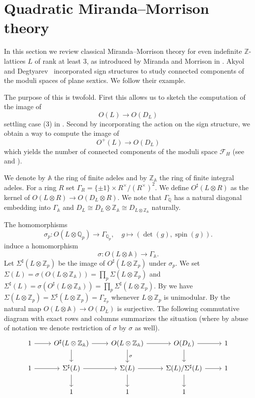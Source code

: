 \documentclass[a4paper]{amsart}
\theoremstyle{definition}
\theoremstyle{plain}
\newcommand{\QQ}{\mathbb{Q}}
\newcommand{\ZZ}{\mathbb{Z}}
\renewcommand{\AA}{\mathbb{A}}
\newcommand{\F}{\mathcal{F}}
\newcommand{\disc}[1]{{D_{#1}}}
\DeclareMathOperator{\spin}{spin}
\begin{document}
\section{Quadratic Miranda--Morrison theory} \label{mmtheory}
%
%
%
%
%
%
%
%
%
%
%
%
%

%

In this section we review classical Miranda--Morrison theory for even indefinite $\ZZ$-lattices $L$ of rank at least $3$,
as introduced by Miranda and Morrison in \cite{miranda-morrisonI, miranda-morrisonII}. Akyol and Degtyarev~\cite{sextics} incorporated sign structures to study connected components of the moduli spaces of plane sextics. We follow their example.

The purpose of this is twofold.
First this allows us to sketch the computation of the image of 
\[O(L) \to O(\disc{L})\]
settling case (3) in .
Second by incorporating the action on the sign structure, we obtain a way to
compute the image of
\[O^+(L) \to O(\disc{L})\]
which yields the number of connected components of the moduli space $\F_H$ (see  and ).


%
%
%
%
%

We denote by $\AA$ %
the ring of finite adeles and by $\ZZ_\AA$ %
the ring of finite integral adeles.
For a ring $R$ set $\Gamma_R= \{\pm 1\} \times R^\times/(R^\times)^2$.
We define $O^\sharp(L\otimes R)$ as the kernel of $O(L \otimes R) \to O(D_L \otimes R)$.
We note that $\Gamma_\QQ$ has a natural diagonal embedding into $\Gamma_\AA$ and $D_L \cong D_L \otimes \ZZ_\AA\cong \disc{L \otimes \ZZ_\AA}$ naturally.

The homomorphisms
\[\sigma_p \colon O(L\otimes \QQ_p) \to \Gamma_{\QQ_p}, \quad g \mapsto (\det(g),\spin(g)).\]
induce a homomorphism
\[ \sigma\colon O(L \otimes \AA) \to \Gamma_{\AA}.\]
Let $\Sigma^\sharp(L \otimes {\ZZ_p})$ be the image of $O^\sharp(L \otimes {\ZZ_p})$
under $\sigma_p$.
We set $\Sigma(L) =\sigma(O(L\otimes \ZZ_\AA))=\prod_p \Sigma(L \otimes \ZZ_p)$
and $\Sigma^\sharp(L) = \sigma(O^\sharp(L \otimes \ZZ_\AA))=\prod_p \Sigma^\sharp(L\otimes \ZZ_p)$.
By \cite[VII 12.11]{miranda-morrison} we have $\Sigma(L\otimes \ZZ_p)=\Sigma^\sharp(L \otimes {\ZZ_p})=\Gamma_{\ZZ_p}$ whenever $L\otimes {\ZZ_p}$ is unimodular.
By \cite[IV.2.14 and IV.5.9]{miranda-morrison} the natural map $O(L\otimes \AA) \to O(\disc{L})$ is surjective.
The following commutative diagram with exact rows and columns summarizes the situation (where by abuse of notation we denote restriction of $\sigma$ by $\sigma$ as well).
\[
\begin{tikzcd}
  1\arrow[r]& O^\sharp(L\otimes \ZZ_\AA) \arrow[r]\arrow[d] &O(L\otimes \ZZ_\AA) \arrow[r]\arrow[d,"\sigma"]& O(\disc{L})\arrow[r]\arrow[d] & 1\\
1\arrow[r]& \Sigma^\sharp(L)\arrow[d] \arrow[r] &\Sigma(L)\arrow[r]\arrow[d] &\Sigma(L)/\Sigma^\sharp(L)\arrow[d] \arrow[r] &1\\
 &1 &1 &1 &
\end{tikzcd}\]
\end{document}
